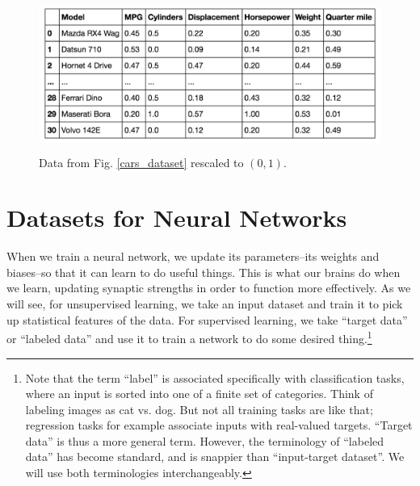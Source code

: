 \begin{figure}[h]
\centering
\includegraphics[height=50mm]{./images/CarsScaled.png}
\caption[Screenshot of Motor Trend Car Road Tests dataset included with R.]{Data from Fig. \ref{cars_dataset} rescaled to $(0,1)$.}
\label{cars_dataset_scaled}
\end{figure}

\section{Datasets for Neural Networks}\label{datasets}

When we train a neural network, we update its parameters--its weights and biases--so that it can learn to do useful things. This is what our brains do when we learn, updating synaptic strengths in order to function more effectively. As we will see, for unsupervised learning, we take an input dataset and train it to pick up statistical features of the data. For supervised learning, we take ``target data'' or ``labeled data'' and use it to train a network to do some desired thing.\footnote{Note that the term ``label'' is associated specifically with classification tasks, where an input is sorted into one of a finite set of categories. Think of labeling images as cat vs. dog. But not all training tasks are like that; regression tasks for example associate inputs with real-valued targets. ``Target data''  is thus a more general term. However, the terminology of ``labeled data''  has become standard, and  is snappier than ``input-target dataset''. We will use both terminologies interchangeably.}

